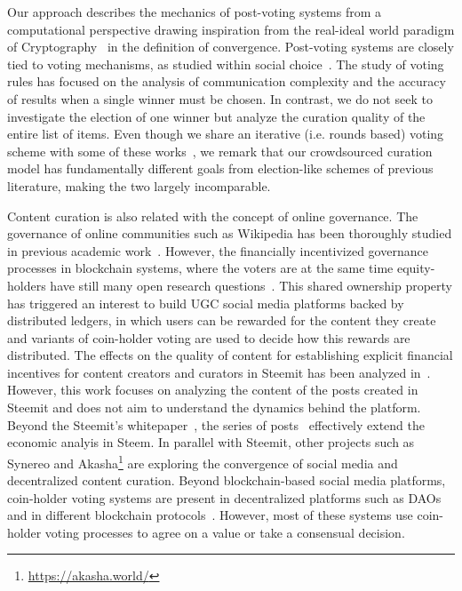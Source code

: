 Our approach  describes the mechanics of post-voting systems from a computational perspective  drawing inspiration from the real-ideal world paradigm of Cryptography~\cite{goldreich1999foundations,lindell}  in the definition of convergence. 
Post-voting systems are closely tied to voting mechanisms, as studied within  social choice~\cite{lu2011robust,conitzer2005communication,xia2010compilation}. The study of voting rules has focused on the analysis of communication complexity and the accuracy of results when a single winner must be chosen. In contrast, we do not seek to investigate the election of one winner but analyze the curation quality of the entire list of items. Even though we share an iterative (i.e. rounds based) voting scheme with some of these works~\cite{kalech2011practical}, we remark that our crowdsourced curation model has fundamentally different goals from election-like schemes of previous literature, making the two largely incomparable.  

  Content curation is also related with the concept of online governance. The governance of online communities such as Wikipedia has been thoroughly studied in previous academic work~\cite{leskovec2010governance,forte2008scaling}. However, the financially incentivized governance processes in blockchain systems, where the voters are at the same time equity-holders have still many open research questions~\cite{vitalik,ehrsam}. This shared ownership property has triggered an interest to build UGC social media platforms backed by distributed ledgers, in which users can be rewarded for the content they create and variants of coin-holder voting are used to decide how this rewards are distributed.  
  The effects on the quality of content for establishing explicit financial incentives for content creators and curators in Steemit has been analyzed in~\cite{thelwall2017can}. 
  However, this work focuses on analyzing the content of the posts created in Steemit and does not aim to understand the dynamics behind the platform. Beyond the Steemit's whitepaper~\cite{steemit}, the series of posts~\cite{curationRewards,selfvoters} effectively extend the economic analyis in Steem. In parallel with Steemit, other projects such as Synereo\cite{synereo} and Akasha\footnote{\url{https://akasha.world/}} are exploring the convergence of social media and decentralized content curation.
   Beyond blockchain-based social media platforms, coin-holder voting systems are present in decentralized platforms such as DAOs~\cite{darkdaos} and in different blockchain protocols~\cite{dash,tezos}. However, most of these systems use coin-holder voting processes to agree on a value or take a consensual decision.
    
    
